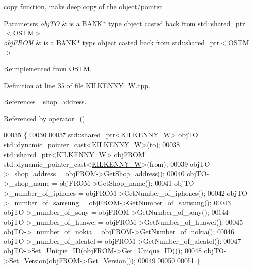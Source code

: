 copy function, make deep copy of the object/pointer 


\begin{DoxyParams}{Parameters}
{\em obj\+TO} & is a B\+A\+N\+K$\ast$ type object casted back from std\+::shared\+\_\+ptr$<$\+O\+S\+T\+M$>$ \\
\hline
{\em obj\+F\+R\+OM} & is a B\+A\+N\+K$\ast$ type object casted back from std\+::shared\+\_\+ptr$<$\+O\+S\+T\+M$>$ \\
\hline
\end{DoxyParams}


Reimplemented from \hyperlink{class_o_s_t_m_a535d90fced5adbb70312c92f3778e08d_a535d90fced5adbb70312c92f3778e08d}{O\+S\+TM}.



Definition at line \hyperlink{_k_i_l_k_e_n_n_y___w_8cpp_source_l00035}{35} of file \hyperlink{_k_i_l_k_e_n_n_y___w_8cpp_source}{K\+I\+L\+K\+E\+N\+N\+Y\+\_\+\+W.\+cpp}.



References \hyperlink{_k_i_l_k_e_n_n_y___w_8h_source_l00109}{\+\_\+shop\+\_\+address}.



Referenced by \hyperlink{_k_i_l_k_e_n_n_y___w_8h_source_l00075}{operator=()}.


\begin{DoxyCode}
00035                                                                      \{
00036 
00037     std::shared\_ptr<KILKENNY\_W> objTO = std::dynamic\_pointer\_cast<\hyperlink{class_k_i_l_k_e_n_n_y___w}{KILKENNY\_W}>(to);
00038     std::shared\_ptr<KILKENNY\_W> objFROM = std::dynamic\_pointer\_cast<\hyperlink{class_k_i_l_k_e_n_n_y___w}{KILKENNY\_W}>(from);
00039     objTO->\hyperlink{class_k_i_l_k_e_n_n_y___w_a278c416a60d21ee6ffa400f6d1348fd5_a278c416a60d21ee6ffa400f6d1348fd5}{\_shop\_address} = objFROM->GetShop\_address();
00040     objTO->\_shop\_name = objFROM->GetShop\_name();
00041     objTO->\_number\_of\_iphones = objFROM->GetNumber\_of\_iphones();
00042     objTO->\_number\_of\_samsung = objFROM->GetNumber\_of\_samsung();
00043     objTO->\_number\_of\_sony = objFROM->GetNumber\_of\_sony();
00044     objTO->\_number\_of\_huawei = objFROM->GetNumber\_of\_huawei();
00045     objTO->\_number\_of\_nokia = objFROM->GetNumber\_of\_nokia();
00046     objTO->\_number\_of\_alcatel = objFROM->GetNumber\_of\_alcatel();
00047     objTO->Set\_Unique\_ID(objFROM->Get\_Unique\_ID());
00048     objTO->Set\_Version(objFROM->Get\_Version());
00049     
00050    
00051 \}
\end{DoxyCode}
